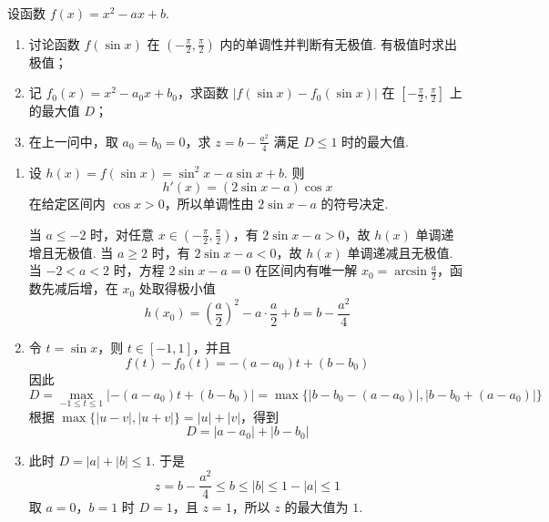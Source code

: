 \begin{problem}
设函数 \( f(x) = x^{2} - ax + b \).

\begin{enumerate}
\item 讨论函数 \( f(\sin x) \) 在 \( \left(-\frac{\pi}{2}, \frac{\pi}{2}\right) \) 内的单调性并判断有无极值. 有极值时求出极值；
\item 记 \( f_{0}(x) = x^{2} - a_{0}x + b_{0} \)，求函数 \( |f(\sin x) - f_{0}(\sin x)| \) 在 \( \left[-\frac{\pi}{2}, \frac{\pi}{2}\right] \) 上的最大值 \(D\)；
\item 在上一问中，取 \(a_0 = b_0 = 0\)，求 \(z = b - \frac{a^2}{4}\) 满足 \(D \leqslant 1\) 时的最大值.
\end{enumerate}
\begin{solution}
\begin{enumerate}
\item 设 \(h(x)=f(\sin x)=\sin^2x-a\sin x+b\). 则
\[
h'(x)=(2\sin x-a)\cos x
\]
在给定区间内 \(\cos x>0\)，所以单调性由 \(2\sin x-a\) 的符号决定.

当 \(a\leqslant-2\) 时，对任意 \(x\in(-\frac\pi2,\frac\pi2)\)，有 \(2\sin x-a>0\)，故 \(h(x)\) 单调递增且无极值. 当 \(a\geqslant2\) 时，有 \(2\sin x-a<0\)，故 \(h(x)\) 单调递减且无极值. 当 \(-2<a<2\) 时，方程 \(2\sin x-a=0\) 在区间内有唯一解 \(x_0=\arcsin\frac a2\)，函数先减后增，在 \(x_0\) 处取得极小值
\[
h(x_0)=\left(\frac a2\right)^2-a\cdot\frac a2+b=b-\frac{a^2}{4}
\]

\item 令 \(t=\sin x\)，则 \(t\in[-1,1]\)，并且
\[
f(t)-f_0(t)=-(a-a_0)t+(b-b_0)
\]
因此
\[
D=\max_{-1\leqslant t\leqslant1}|-(a-a_0)t+(b-b_0)|
=\max\{|b-b_0-(a-a_0)|,|b-b_0+(a-a_0)|\}
\]
根据 \(\max\{|u-v|,|u+v|\}=|u|+|v|\)，得到
\[
D=|a-a_0|+|b-b_0|
\]

\item 此时 \(D=|a|+|b|\leqslant1\). 于是
\[
z=b-\frac{a^2}{4}\leqslant b\leqslant|b|\leqslant1-|a|\leqslant1
\]
取 \(a=0\)，\(b=1\) 时 \(D=1\)，且 \(z=1\)，所以 \(z\) 的最大值为 \(1\).
\end{enumerate}
\end{solution}
\end{problem}
